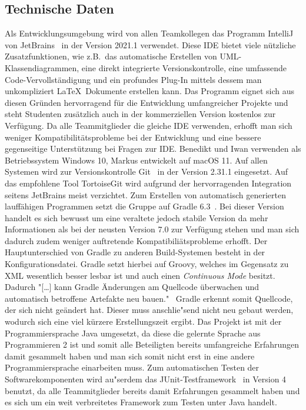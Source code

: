 \subsection{Technische Daten}\label{subsec:technische-daten}
Als Entwicklungsumgebung wird von allen Teamkollegen das Programm IntelliJ von JetBrains~\cite{intellij} in der Version 2021.1 verwendet.
Diese IDE bietet viele n\"utzliche Zusatzfunktionen, wie z.B.\ das automatische Erstellen von UML-Klassendiagrammen, eine direkt integrierte Versionskontrolle, eine umfassende Code-Vervollst\"andigung und ein profundes Plug-In mittels dessem man unkompliziert \LaTeX\ Dokumente erstellen kann.
Das Programm eignet sich aus diesen Gr\"unden hervorragend f\"ur die Entwicklung umfangreicher Projekte und steht Studenten zus\"atzlich auch in der kommerziellen Version kostenlos zur Verf\"ugung.
Da alle Teammitglieder die gleiche IDE verwenden, erhofft man sich weniger Kompatibilit\"atsprobleme bei der Entwicklung und eine bessere gegenseitige Unterst\"utzung bei Fragen zur IDE.
Benedikt und Iwan verwenden als Betriebssystem Windows 10, Markus entwickelt auf macOS 11.
Auf allen Systemen wird zur Versionskontrolle Git~\cite{git} in der Version 2.31.1 eingesetzt.
Auf das empfohlene Tool TortoiseGit wird aufgrund der hervorragenden Integration seitens JetBrains meist verzichtet.
Zum Erstellen von automatisch generierten lauff\"ahigen Programmen setzt die Gruppe auf Gradle 6.3~\cite{gradle}.
Bei dieser Version handelt es sich bewusst um eine veraltete jedoch stabile Version da mehr Informationen als bei der neusten Version 7.0 zur Verf\"ugung stehen und man sich dadurch zudem weniger auftretende Kompatibili\"atsprobleme erhofft.
Der Hauptunterschied von Gradle zu anderen Build-Systemen besteht in der Konfigurationsdatei.
Gradle setzt hierbei auf Groovy, welches im Gegensatz zu XML wesentlich besser lesbar ist und auch einen \emph{Continuous Mode} besitzt.
Dadurch "[\ldots] kann Gradle \"Anderungen am Quellcode \"uberwachen und automatisch betroffene Artefakte neu bauen." \cite[S. 219 ff.]{besserCoden:gradle}
\ Gradle erkennt somit Quellcode, der sich nicht ge\"andert hat.
Dieser muss anschlie"send nicht neu gebaut werden, wodurch sich eine viel k\"urzere Erstellungszeit ergibt.
Das Projekt ist mit der Programmiersprache Java umgesetzt, da diese die gelernte Sprache aus Programmieren 2 ist und somit alle Beteiligten bereits umfangreiche Erfahrungen damit gesammelt haben und man sich somit nicht erst in eine andere Programmiersprache einarbeiten muss.
Zum automatischen Testen der Softwarekomponenten wird au"serdem das JUnit-Testframework~\cite{junit} in Version 4 benutzt, da alle Teammitglieder bereits damit Erfahrungen gesammelt haben und es sich um ein weit verbreitetes Framework zum Testen unter Java handelt.

